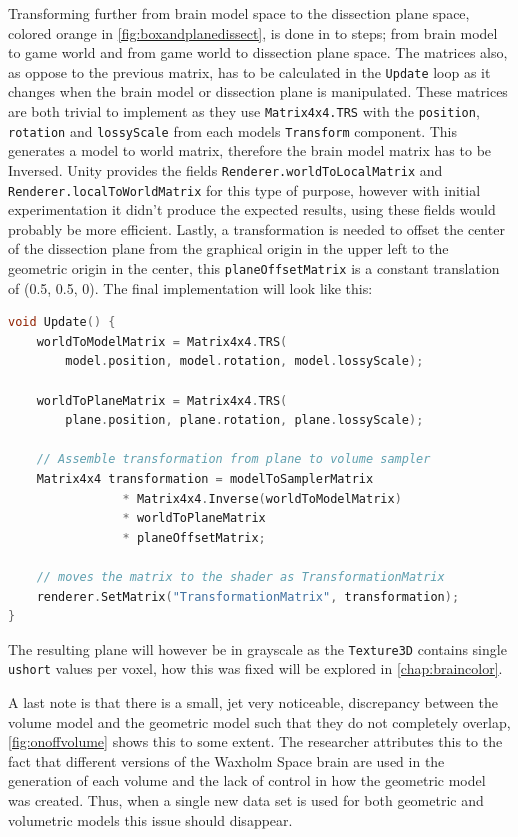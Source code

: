 Transforming further from brain model space to the dissection plane space, colored orange in \autoref{fig:boxandplanedissect}, is done in to steps; from brain model to game world and from game world to dissection plane space. The matrices also, as oppose to the previous matrix, has to be calculated in the \texttt{Update} loop as it changes when the brain model or dissection plane is manipulated. These matrices are both trivial to implement as they use \texttt{Matrix4x4.TRS} with the \texttt{position}, \texttt{rotation} and \texttt{lossyScale} from each models \texttt{Transform} component.  This generates a model to world matrix, therefore the brain model matrix has to be Inversed. Unity provides the fields \texttt{Renderer.worldToLocalMatrix} and \\\texttt{Renderer.localToWorldMatrix} for this type of purpose, however with initial experimentation it didn't produce the expected results, using these fields would probably be more efficient. Lastly, a transformation is needed to offset the center of the dissection plane from the graphical origin in the upper left to the geometric origin in the center, this \texttt{planeOffsetMatrix} is a constant translation of (0.5, 0.5, 0). The final implementation will look like this:
\begin{lstlisting}[language=c++]
void Update() {
    worldToModelMatrix = Matrix4x4.TRS(
        model.position, model.rotation, model.lossyScale);

    worldToPlaneMatrix = Matrix4x4.TRS(
        plane.position, plane.rotation, plane.lossyScale);

    // Assemble transformation from plane to volume sampler
    Matrix4x4 transformation = modelToSamplerMatrix 
                * Matrix4x4.Inverse(worldToModelMatrix)
                * worldToPlaneMatrix
                * planeOffsetMatrix;

    // moves the matrix to the shader as TransformationMatrix
    renderer.SetMatrix("TransformationMatrix", transformation);
}
\end{lstlisting}
The resulting plane will however be in grayscale as the \texttt{Texture3D} contains single \texttt{ushort} values per voxel, how this was fixed will be explored in \autoref{chap:braincolor}.

A last note is that there is a small, jet very noticeable, discrepancy between the volume model and the geometric model such that they do not completely overlap, \autoref{fig:onoffvolume} shows this to some extent. The researcher attributes this to the fact that different versions of the Waxholm Space brain are used in the generation of each volume and the lack of control in how the geometric model was created. Thus, when a single new data set is used for both geometric and volumetric models this issue should disappear.

